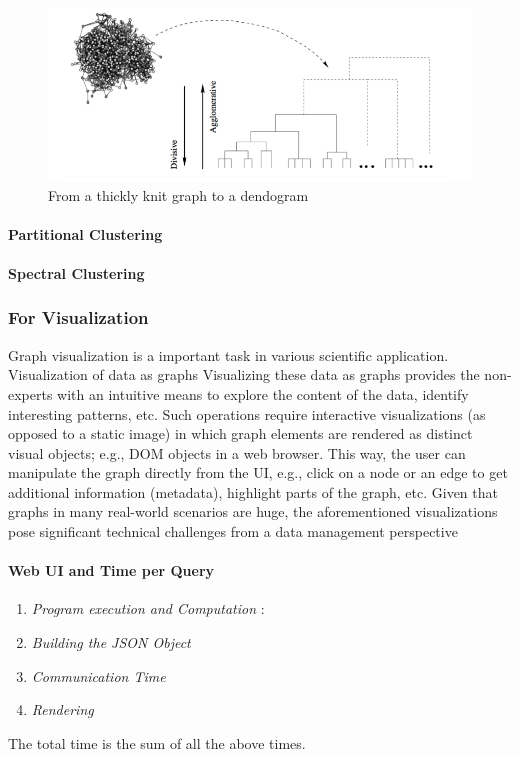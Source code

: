 \begin{figure}[H]
\centering
\includegraphics[scale=0.5]{hirac.png}
\caption{\label{herar}From a thickly knit graph to a dendogram}
\end{figure}
\paragraph{Partitional Clustering}

\paragraph{Spectral Clustering}





\subsubsection{For  Visualization}
Graph visualization is a important task in various scientific application. Visualization of data as graphs Visualizing these data
as graphs provides the non-experts with an intuitive means
to explore the content of the data, identify interesting patterns,
etc. Such operations require interactive visualizations
(as opposed to a static image) in which graph elements are
rendered as distinct visual objects; e.g., DOM objects in a
web browser. This way, the user can manipulate the graph
directly from the UI, e.g., click on a node or an edge to
get additional information (metadata), highlight parts of the
graph, etc. Given that graphs in many real-world scenarios
are huge, the aforementioned visualizations pose significant
technical challenges from a data management perspective

\paragraph{Web UI and Time per Query}
\begin{enumerate}
\item \textit{Program execution and Computation} : 
\item \textit{Building the JSON Object}
\item \textit{Communication Time}
\item \textit{Rendering }
\end{enumerate}
The total time is the sum of all the above times. 

